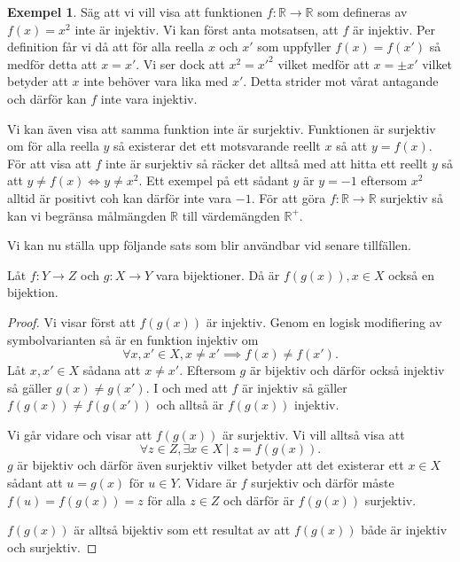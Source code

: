 \documentclass{article}
\theoremstyle{definition}
\newtheorem{exmp}[thm]{Exempel}
\begin{document}
\begin{exmp}
Säg att vi vill visa att funktionen $f: \mathbb{R} \rightarrow \mathbb{R}$ som defineras av 
$f(x) = x^2$ inte är injektiv. Vi kan först anta motsatsen, att $f$ är injektiv. Per definition får vi då att för alla reella $x$ och $x'$ som uppfyller $f(x) = f(x')$
så medför detta att $x = x'$. Vi ser dock att $x^2 = x'^2$ vilket medför att $x = \pm x'$ vilket betyder att $x$ inte behöver vara lika med $x'$. Detta strider mot vårat antagande och
därför kan $f$ inte vara injektiv.

Vi kan även visa att samma funktion inte är surjektiv. Funktionen är surjektiv om för alla reella $y$ så existerar det ett motsvarande reellt $x$ så att $y=f(x)$. För 
att visa att $f$ inte är surjektiv så räcker det alltså med att hitta ett reellt $y$ så att $y \neq f(x) \iff y \neq x^2$. Ett exempel på ett sådant $y$ är $y = -1$ eftersom $x^2$
alltid är positivt coh kan därför inte vara $-1$. För att göra $f: \mathbb{R} \rightarrow \mathbb{R}$ surjektiv så kan vi begränsa målmängden $\mathbb{R}$ till värdemängden $\mathbb{R}^+$.

\end{exmp}

Vi kan nu ställa upp följande sats som blir användbar vid senare tillfällen. 
\hypertarget{kompbij}{}
\begin{mytheo}{}{}
  Låt $f: Y \rightarrow Z$ och $g: X \rightarrow Y$ vara bijektioner. Då är $f(g(x)), x \in X$ 
  också en bijektion.
\end{mytheo}
\begin{proof}
  Vi visar först att $f(g(x))$ är injektiv. Genom en logisk modifiering av symbolvarianten 
  så är en funktion injektiv om
  \[ \forall x, x' \in X, x \neq x' \implies f(x) \neq f(x'). \]
  Låt $x, x' \in X$ sådana att $x \neq x'.$ Eftersom $g$ är bijektiv och därför också injektiv 
  så gäller $g(x) \neq g(x')$. I och med att $f$ är injektiv så gäller $f(g(x)) \neq f(g(x'))$
  och alltså är $f(g(x))$ injektiv.

  Vi går vidare och visar att $f(g(x))$ är surjektiv. Vi vill alltså visa att 
  \[\forall z \in Z, \exists x \in X \; | \; z = f(g(x)).\]
  $g$ är bijektiv och därför även surjektiv vilket betyder att det existerar 
  ett $x \in X$ sådant att $u = g(x)$ för $u \in Y.$ Vidare är $f$ surjektiv och därför 
  måste $f(u) = f(g(x)) = z$ för alla $z \in Z$ och därför är $f(g(x))$ surjektiv.
  
  $f(g(x))$ är alltså bijektiv som ett resultat av att $f(g(x))$ både är injektiv och surjektiv. 
\end{proof}
\end{document}
